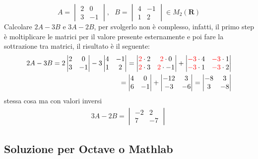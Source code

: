 \documentclass{book}
\begin{document}
\begin{equation}
  \label{eq:es1}
  A=
  \begin{vmatrix}
    2 & 0 \\
    3 & -1
  \end{vmatrix}, \text{ } B=
  \begin{vmatrix}
    4 & -1\\
    1 & 2
  \end{vmatrix} \in M_2(\mathbf{R})
\end{equation}
Calcolare $2A-3B$ e $3A-2B$, per svolgerlo non è complesso, infatti, il primo
step è moltiplicare le matrici per il valore presente esternamente e poi fare
la sottrazione tra matrici, il risultato è il seguente:
\begin{eqnarray*}
  \label{eq:es1_sv}
  2A-3B = 2 \begin{vmatrix}
    2 & 0 \\
    3 & -1
  \end{vmatrix} - 3\begin{vmatrix}
    4 & -1\\
    1 & 2
  \end{vmatrix}=\begin{vmatrix}
    {\color{red}2}\cdot2 & {\color{red}2}\cdot0 \\
    {\color{red}2}\cdot3 & {\color{red}2}\cdot-1
  \end{vmatrix} +\begin{vmatrix}
    {\color{red}-3}\cdot4 & {\color{red}-3}\cdot1\\
    {\color{red}-3}\cdot1 & {\color{red}-3}\cdot2
                 \end{vmatrix}\\
  =
  \begin{vmatrix}
    4 &0\\
    6 &-1
  \end{vmatrix} +
  \begin{vmatrix}
    -12 & 3\\
    -3 &-6
  \end{vmatrix}=
  \begin{vmatrix}
    -8 & 3\\
    3 & -8
  \end{vmatrix}
\end{eqnarray*}
stessa cosa ma con valori inversi 
\begin{eqnarray*}
  3A-2B=
  \begin{vmatrix}
    -2 & 2 \\
    7 & -7
  \end{vmatrix}
\end{eqnarray*}

\subsection{Soluzione per Octave o Mathlab}
\label{sec:solmatoctes1}

\end{document}
